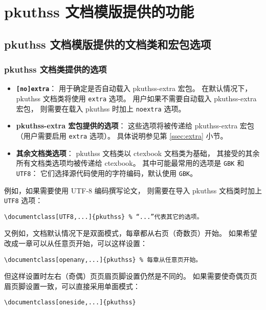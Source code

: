 
\chapter{pkuthss 文档模版提供的功能}
	\section{pkuthss 文档模版提供的文档类和宏包选项}
		\subsection{pkuthss 文档类提供的选项}

		\begin{itemize}
			\item \textbf{\texttt{[no]extra}}：
				用于确定是否自动载入 pkuthss-extra 宏包。
				在默认情况下，pkuthss 文档类将使用 \verb|extra| 选项。
				用户如果不需要自动载入 pkuthss-extra 宏包，
				则需要在载入 pkuthss 时加上 \verb|noextra| 选项。

			\item \textbf{pkuthss-extra 宏包提供的选项}：
				这些选项将被传递给 pkuthss-extra 宏包
				（用户需要启用 \verb|extra| 选项）。
				具体说明参见第 \ref{ssec:extra} 小节。

			\item \textbf{其余文档类选项}：%
				pkuthss 文档类以 ctexbook 文档类为基础，
				其接受的其余所有文档类选项均被传递给 ctexbook。
				其中可能最常用的选项是 \verb|GBK| 和 \verb|UTF8|：
				它们选择源代码使用的字符编码，默认使用 \verb|GBK|。
		\end{itemize}

		例如，如果需要使用 UTF-8 编码撰写论文，
		则需要在导入 pkuthss 文档类时加上 \verb|UTF8| 选项：
\begin{Verbatim}[frame=single]
\documentclass[UTF8,...]{pkuthss} % “...”代表其它的选项。
\end{Verbatim}

		又例如，文档默认情况下是双面模式，每章都从右页（奇数页）开始。
		如果希望改成一章可以从任意页开始，可以这样设置：
\begin{Verbatim}[frame=single]
\documentclass[openany,...]{pkuthss} % 每章从任意页开始。
\end{Verbatim}
		但这样设置时左右（奇偶）页页眉页脚设置仍然是不同的。
		如果需要使奇偶页页眉页脚设置一致，可以直接采用单面模式：
\begin{Verbatim}[frame=single]
% 使用 oneside 选项时不需要再指定 openany 选项。
\documentclass[oneside,...]{pkuthss}
\end{Verbatim}

